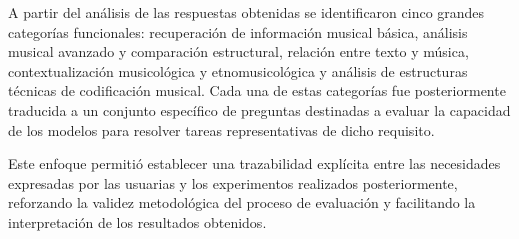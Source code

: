 A partir del análisis de las respuestas obtenidas se identificaron cinco grandes categorías funcionales: recuperación de información musical básica, análisis musical avanzado y comparación estructural, relación entre texto y música, contextualización musicológica y etnomusicológica y análisis de estructuras técnicas de codificación musical. Cada una de estas categorías fue posteriormente traducida a un conjunto específico de preguntas destinadas a evaluar la capacidad de los modelos para resolver tareas representativas de dicho requisito.

Este enfoque permitió establecer una trazabilidad explícita entre las necesidades expresadas por las usuarias y los experimentos realizados posteriormente, reforzando la validez metodológica del proceso de evaluación y facilitando la interpretación de los resultados obtenidos.


